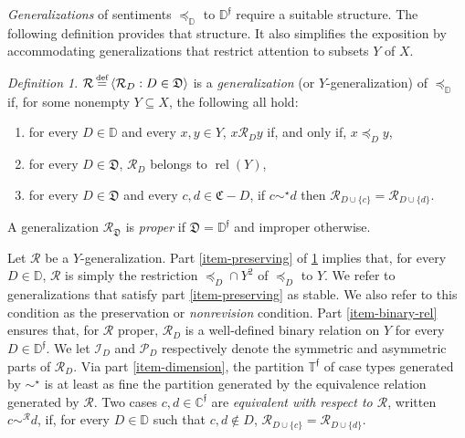 \documentclass[ecta,nameyear,draft]{econsocart}
\newcommand{\bs}{-}%
\newcommand{\mc}{\mathcal}
\newcommand\defeq{\mathrel{\overset{\makebox[0pt]{\mbox{\normalfont\tiny def}}}{=}}}%
\newcommand{\relations}{\operatorname{rel}}
\newcommand{\novel}{\mathfrak f}
\newcommand{\precsimb}{\mathbin{\preceq}}
\newcommand{\preceqb}{\mathbin{\preceq}}
\newcommand{\ext}{\mathrel{\mc R}}
\newcommand{\sext}{\mathrel{\mc P}}
\newcommand{\next}{\mathrel{\mc I}}
\newcommand{\extb}{\mathbin{\mc R}}
\newcommand{\mbbd}{{\mathds D}}
\newcommand{\mbbdp}{{\mathds D^{\novel}}}
\newcommand{\dpp}{{\mathfrak D}}
\newcommand{\mbbcp}{{\mathds C^{\novel}}}
\newcommand{\cpp}{{\mathfrak C}}
\newcommand{\mbbtp}{{\mathds{T}^\novel}}
\theoremstyle{plain}
\theoremstyle{remark}
\newtheorem{definition}{Definition}%
\begin{document}
\emph{Generalizations} of sentiments $\precsimb_\mbbd$ to $\mbbdp$ require a
suitable structure. The following definition provides that structure. It also
simplifies the exposition by accommodating generalizations that restrict
attention to subsets $Y$ of $X$.
\begin{definition}\label{def-generalization} $\extb \defeq \langle \extb_{D}:
  D\in \dpp \rangle$ is a \emph{generalization} (or $Y$-generalization) of
  $\preceq_{\mbbd}$ if, for some nonempty $Y \subseteq X$, the following all
  hold$:$
  \begin{enumerate}%
    \item \label{item-preserving} for every $D \in \mbbd$ and every $x,y\in Y$,
      $x \ext_{D} y$ if, and only if, $x \preceq_{D} y$,
    \item\label{item-binary-rel} for every $D\in \dpp$, $\ext_{D}$ belongs to
      $\relations (Y)$,
    \item \label{item-dimension} for every $D\in \dpp$ and every $c,d \in
      \cpp\bs D$,  if $c \sim^\star d$ then $\extb _ {D \cup \{c\}} = \extb _
      {D \cup \{d\}}$.
  \end{enumerate}
  A generalization $\ext_{\dpp}$ is \emph{proper} if $\dpp = \mbbdp$ and
  improper otherwise.
\end{definition}
Let $\ext$ be a $Y$-generalization.  Part \ref{item-preserving} of
\cref{def-generalization} implies that, for every $D\in \mbbd$, $\ext$ is
simply the restriction $\preceqb_{D}\cap Y^{2}$ of $\preceq_{D}$ to $Y$. We
refer to generalizations that satisfy part \ref{item-preserving} as stable. We
also refer to this condition as the preservation or \emph{nonrevision}
condition. Part \ref{item-binary-rel} ensures that, for $\ext$ proper,
$\ext_{D}$ is a well-defined binary relation on $Y$ for every $D \in \mbbdp$.
We let $\next_{D}$ and $\sext_{D}$ respectively denote the symmetric and
asymmetric parts of $\ext_{D}$. Via part \ref{item-dimension}, the partition
$\mbbtp$ of case types generated by $\sim^{\star}$ is at least as fine the
partition generated by the equivalence relation generated by $\ext$. Two cases
$c,d \in \mbbcp$ are \emph{equivalent with respect to $\ext$}, written $c
\sim^{\extb}
d$, if, for every $D \in \mbbd$ such that $c,d \notin D$, $\extb_{D \cup \{c\}}
= \extb_{D \cup \{d\}}$.
\end{document}
